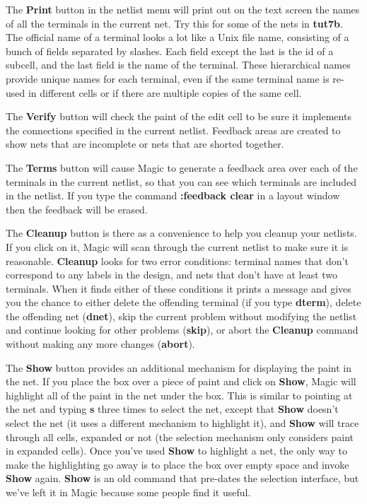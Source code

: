 \documentclass[letterpaper,twoside,12pt]{article}
\begin{document}
The {\bfseries Print} button in the netlist menu will print out on
the text screen the names of all the terminals in the current
net.  Try this for some of the nets in {\bfseries tut7b}.
The official name of a terminal looks
a lot like a Unix file name, consisting of a bunch of fields
separated by slashes.  Each field except the last is the
id of a subcell, and the last field is the name of the terminal.
These hierarchical names provide unique names for each terminal,
even if the same terminal name is re-used in different cells or
if there are multiple copies of the same cell.

The {\bfseries Verify} button will check the paint of the edit cell
to be sure it implements the connections specified in the
current netlist.  Feedback areas are created to show
nets that are incomplete or nets that are shorted together.

The {\bfseries Terms} button will cause Magic to generate a feedback
area over each of the terminals in the current netlist, so
that you can see which terminals are included in the netlist.
If you type the command {\bfseries :feedback clear} in a layout
window then the feedback will be erased.

The {\bfseries Cleanup} button is there as a convenience to help
you cleanup your netlists.  If you click on it, Magic will
scan through the current netlist to make sure it is reasonable.
{\bfseries Cleanup} looks for two error conditions:  terminal names
that don't correspond to any labels in the design, and nets
that don't have at least two terminals.  When it finds either
of these conditions it prints a message and gives you the
chance to either delete the offending terminal (if you type
{\bfseries dterm}), delete the offending net ({\bfseries dnet}), skip the
current problem without modifying the netlist and continue
looking for other problems ({\bfseries skip}), or abort the {\bfseries Cleanup}
command without making any more changes ({\bfseries abort}).

The {\bfseries Show} button provides an additional mechanism for displaying
the paint in the net.  If you place the box over a piece
of paint and click on {\bfseries Show}, Magic will highlight all of the
paint in the net under the box.  This is similar to pointing at the net and
typing {\bfseries s} three times to select the net, except that {\bfseries Show}
doesn't select the net (it uses a different mechanism to highlight it),
and {\bfseries Show} will trace through all cells, expanded or not (the
selection mechanism only considers paint in expanded cells).  Once you've
used {\bfseries Show} to highlight a net, the only way to make the highlighting
go away is to place the box over empty space and invoke {\bfseries Show} again.
{\bfseries Show} is an old command that pre-dates the selection interface,
but we've left it in Magic because some people find it useful.
\end{document}
